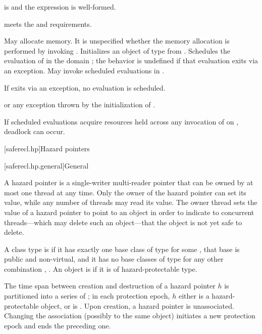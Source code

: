 \begin{itemdescr}
\pnum
\mandates
{} is  and
the expression  is well-formed.

\pnum
\expects
{} meets the  and
 requirements.

\pnum
\effects
May allocate memory.
It is unspecified whether the memory allocation
is performed by invoking .
Initializes an object  of type  from .
Schedules the evaluation of  in the domain ;
the behavior is undefined if that evaluation exits via an exception.
May invoke scheduled evaluations in .
\begin{note}
If  exits via an exception, no evaluation
is scheduled.
\end{note}

\pnum
\throws
{} or any exception thrown by the initialization of .

\pnum
\begin{note}
If scheduled evaluations acquire resources
held across any invocation of  on ,
deadlock can occur.
\end{note}
\end{itemdescr}

[saferecl.hp]{Hazard pointers}

[saferecl.hp.general]{General}

\pnum
{}%
A hazard pointer is a single-writer multi-reader pointer
that can be owned by at most one thread at any time.
Only the owner of the hazard pointer can set its value,
while any number of threads may read its value.
The owner thread sets the value of a hazard pointer to point to an object
in order to indicate to concurrent threads---which
may delete such an object---that
the object is not yet safe to delete.

\pnum
A class type  is 
if it has exactly one base class of type 
for some ,
that base is public and non-virtual, and
it has no base classes of type 
for any other combination , .
An object is  if it is of hazard-protectable type.

\pnum
The time span between creation and destruction of a hazard pointer $h$
is partitioned into a series of ;
in each protection epoch,
$h$ either is 
a hazard-protectable object, or is .
Upon creation, a hazard pointer is unassociated.
Changing the association (possibly to the same object)
initiates a new protection epoch and ends the preceding one.


